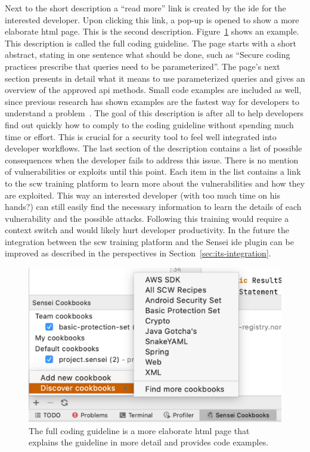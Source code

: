 Next to the short description a “read more” link is created by the \gls{ide} for the interested developer.
Upon clicking this link, a pop-up is opened to show a more elaborate \gls{html} page.
This is the second description.
Figure~\ref{fig:fulldescription} shows an example.
This description is called the full coding guideline.
The page starts with a short abstract, stating in one sentence what should be done, such as “Secure coding practices prescribe that queries need to be parameterized”.
The page's next section presents in detail what it means to use parameterized queries and gives an overview of the approved \gls{api} methods.
Small code examples are included as well, since previous research has shown examples are the fastest way for developers to understand a problem~\cite{whitney2018embedding}.
The goal of this description is after all to help developers find out quickly how to comply to the coding guideline without spending much time or effort.
This is crucial for a security tool to feel well integrated into developer workflows.
The last section of the description contains a list of possible consequences when the developer fails to address this issue.
There is no mention of vulnerabilities or exploits until this point.
Each item in the list contains a link to the \gls{scw} training platform to learn more about the vulnerabilities and how they are exploited.
This way an interested developer (with too much time on his hands?) can still easily find the necessary information to learn the details of each vulnerability and the possible attacks.
Following this training would require a context switch and would likely hurt developer productivity.
In the future the integration between the \gls{scw} training platform and the Sensei \gls{ide} plugin can be improved as described in the perspectives in Section~\ref{sec:its-integration}.

\begin{figure}
  \centering
  \includegraphics[width=\textwidth,page=7]{04-tools/figures/figures1.pdf}
  \caption[Example of the full coding guideline.]{The full coding guideline is a more elaborate \gls{html} page that explains the guideline in more detail and provides code examples.}
  \label{fig:fulldescription}
\end{figure}

